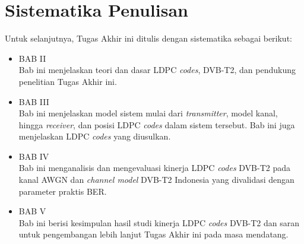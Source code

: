 \section{Sistematika Penulisan}
Untuk selanjutnya, Tugas Akhir ini ditulis dengan sistematika sebagai berikut:
\begin{itemize}
	\item BAB II \babDua \\
	Bab ini menjelaskan teori dan dasar LDPC \textit{codes}, DVB-T2, dan pendukung penelitian Tugas Akhir ini.
	\item BAB III \babTiga \\
	Bab ini menjelaskan model sistem mulai dari \textit{transmitter}, model kanal, hingga \textit{receiver}, dan posisi LDPC \textit{codes} dalam sistem tersebut. Bab ini juga menjelaskan LDPC \textit{codes} yang diusulkan.	
	\item BAB IV \babEmpat \\
	Bab ini menganalisis dan mengevaluasi kinerja LDPC \textit{codes} DVB-T2 pada kanal AWGN dan \textit{channel model} DVB-T2 Indonesia yang divalidasi dengan parameter praktis BER.
	\item BAB V \babLima \\
	Bab ini berisi kesimpulan hasil studi kinerja LDPC \textit{codes} DVB-T2 dan saran untuk pengembangan lebih lanjut Tugas Akhir ini pada masa mendatang.
\end{itemize}

